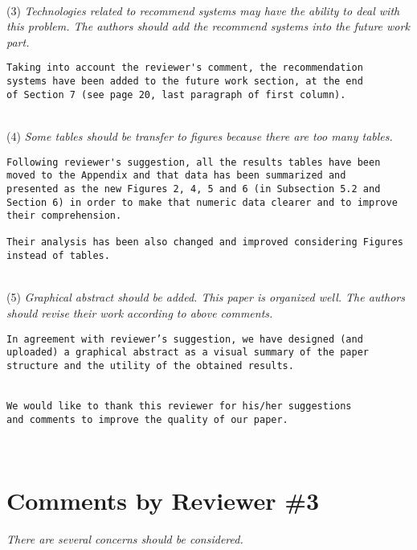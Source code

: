 \documentclass[preprint]{elsarticle}
\begin{document}
~\\
\noindent (3) \emph{Technologies related to recommend systems may have the ability to deal with this problem. The authors should add the recommend systems into the future work part. } 

\begin{verbatim}
Taking into account the reviewer's comment, the recommendation 
systems have been added to the future work section, at the end 
of Section 7 (see page 20, last paragraph of first column).
\end{verbatim}


~\\
\noindent (4) \emph{Some tables should be transfer to figures because there are too many tables. } 

\begin{verbatim}
Following reviewer's suggestion, all the results tables have been 
moved to the Appendix and that data has been summarized and 
presented as the new Figures 2, 4, 5 and 6 (in Subsection 5.2 and 
Section 6) in order to make that numeric data clearer and to improve 
their comprehension.

Their analysis has been also changed and improved considering Figures 
instead of tables.
\end{verbatim}


~\\
\noindent (5) \emph{Graphical abstract should be added. This paper is organized well. The authors should revise their work according to above comments. } 

\begin{verbatim}
In agreement with reviewer’s suggestion, we have designed (and 
uploaded) a graphical abstract as a visual summary of the paper 
structure and the utility of the obtained results.


We would like to thank this reviewer for his/her suggestions 
and comments to improve the quality of our paper.
\end{verbatim}

~\\


\section{Comments by Reviewer \#3}

\noindent \emph{There are several concerns should be considered.}\\
\end{document}

